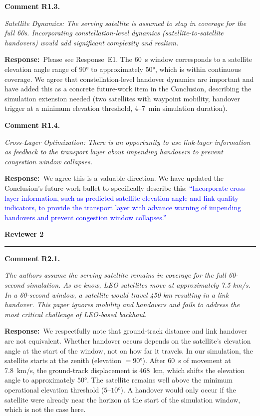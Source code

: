 \documentclass[11pt]{article}
\newcommand{\reviewer}[1]{\vspace{1em}\noindent\textbf{\large #1}\vspace{0.4em}\hrule\vspace{0.6em}}
\newcommand{\comment}[2]{\vspace{0.8em}\noindent\textbf{Comment #1.}\begin{reviewbox}\textit{#2}\end{reviewbox}}
\newcommand{\response}{\noindent\textbf{Response:}~}
\newcommand{\revised}[1]{\textcolor{blue}{``#1''}}
\begin{document}
\comment{R1.3}{Satellite Dynamics: The serving satellite is assumed to stay in coverage for the full 60s. Incorporating constellation-level dynamics (satellite-to-satellite handovers) would add significant complexity and realism.}

\response Please see Response~E1. The 60~s window corresponds to a satellite elevation angle range of $90°$ to approximately $50°$, which is within continuous coverage. We agree that constellation-level handover dynamics are important and have added this as a concrete future-work item in the Conclusion, describing the simulation extension needed (two satellites with waypoint mobility, handover trigger at a minimum elevation threshold, 4--7~min simulation duration).

\comment{R1.4}{Cross-Layer Optimization: There is an opportunity to use link-layer information as feedback to the transport layer about impending handovers to prevent congestion window collapses.}

\response We agree this is a valuable direction. We have updated the Conclusion's future-work bullet to specifically describe this: \revised{Incorporate cross-layer information, such as predicted satellite elevation angle and link quality indicators, to provide the transport layer with advance warning of impending handovers and prevent congestion window collapses.}

\reviewer{Reviewer 2}

\comment{R2.1}{The authors assume the serving satellite remains in coverage for the full 60-second simulation. As we know, LEO satellites move at approximately 7.5 km/s. In a 60-second window, a satellite would travel 450 km resulting in a link handover. This paper ignores mobility and handovers and fails to address the most critical challenge of LEO-based backhaul.}

\response We respectfully note that ground-track distance and link handover are not equivalent. Whether handover occurs depends on the satellite's elevation angle at the start of the window, not on how far it travels. In our simulation, the satellite starts at the zenith (elevation $= 90°$). After 60~s of movement at 7.8~km/s, the ground-track displacement is 468~km, which shifts the elevation angle to approximately $50°$. The satellite remains well above the minimum operational elevation threshold ($5$--$10°$). A handover would only occur if the satellite were already near the horizon at the start of the simulation window, which is not the case here.
\end{document}
